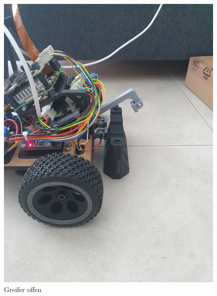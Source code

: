 \begin{figure}[H]
\centering
\begin{minipage}[b]{0.49\textwidth}
  \centering
    \includegraphics[width=\textwidth, angle=-90]{assets/MT/greifer-open.jpg}
    \caption{Greifer offen}
    \label{fig:greifer-open1}
\end{minipage}
\hfill
\begin{minipage}[b]{0.49\textwidth}
  \centering

\end{minipage}
\end{figure}

